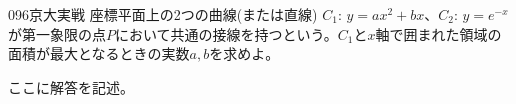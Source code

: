 \begin{prob}{096}{}{京大実戦}
 座標平面上の2つの曲線(または直線) $C_1$: $y=ax^2+bx$、$C_2$: $y=e^{-x}$が第一象限の点$P$において共通の接線を持つという。$C_1$と$x$軸で囲まれた領域の面積が最大となるときの実数$a, b$を求めよ。
\end{prob}
ここに解答を記述。